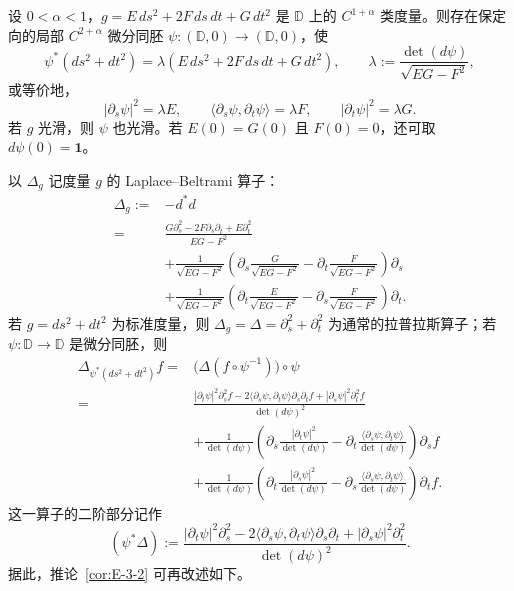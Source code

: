 \begin{corollary}\label{cor:E-3-2}
设 $0<\alpha<1$，$g=E\,ds^2+2F\,ds\,dt+G\,dt^2$ 是 $\mathbb D$ 上的 $C^{1+\alpha}$ 类度量。则存在保定向的局部 $C^{2+\alpha}$ 微分同胚 $\psi:(\mathbb D,0)\to(\mathbb D,0)$，使
\[
  \psi^*(ds^2+dt^2)=\lambda(E\,ds^2+2F\,ds\,dt+G\,dt^2),
  \qquad \lambda:=\frac{\det(d\psi)}{\sqrt{EG-F^2}},
\]
或等价地，
\[
  |\partial_s\psi|^2=\lambda E,\qquad
  \langle\partial_s\psi,\partial_t\psi\rangle=\lambda F,\qquad
  |\partial_t\psi|^2=\lambda G.
\]
若 $g$ 光滑，则 $\psi$ 也光滑。若 $E(0)=G(0)$ 且 $F(0)=0$，还可取 $d\psi(0)=\mathbf1$。
\end{corollary}

以 $\Delta_g$ 记度量 $g$ 的 Laplace--Beltrami 算子：
\begin{align*}
\Delta_g:={}&-d^*d\\
={}&\frac{G\partial_s^2-2F\partial_s\partial_t+E\partial_t^2}{EG-F^2}\\
&+\frac1{\sqrt{EG-F^2}}
 \left(\partial_s\frac{G}{\sqrt{EG-F^2}}-\partial_t\frac{F}{\sqrt{EG-F^2}}\right)\partial_s\\
&+\frac1{\sqrt{EG-F^2}}
 \left(\partial_t\frac{E}{\sqrt{EG-F^2}}-\partial_s\frac{F}{\sqrt{EG-F^2}}\right)\partial_t.
\end{align*}
若 $g=ds^2+dt^2$ 为标准度量，则 $\Delta_g=\Delta=\partial_s^2+\partial_t^2$ 为通常的拉普拉斯算子；若 $\psi:\mathbb D\to\mathbb D$ 是微分同胚，则
\begin{align*}
\Delta_{\psi^*(ds^2+dt^2)}f
={}&\bigl(\Delta(f\circ\psi^{-1})\bigr)\circ\psi\\
={}&\frac{|\partial_t\psi|^2\partial_s^2f
 -2\langle\partial_s\psi,\partial_t\psi\rangle\partial_s\partial_tf
 +|\partial_s\psi|^2\partial_t^2f}{\det(d\psi)^2}\\
&+\frac1{\det(d\psi)}\left(
 \partial_s\frac{|\partial_t\psi|^2}{\det(d\psi)}
 -\partial_t\frac{\langle\partial_s\psi,\partial_t\psi\rangle}{\det(d\psi)}\right)\partial_sf\\
&+\frac1{\det(d\psi)}\left(
 \partial_t\frac{|\partial_s\psi|^2}{\det(d\psi)}
 -\partial_s\frac{\langle\partial_s\psi,\partial_t\psi\rangle}{\det(d\psi)}\right)\partial_tf.
\end{align*}
这一算子的二阶部分记作
\begin{equation}\label{eq:E-3-1}
  (\psi^*\Delta):=
  \frac{|\partial_t\psi|^2\partial_s^2
  -2\langle\partial_s\psi,\partial_t\psi\rangle\partial_s\partial_t
  +|\partial_s\psi|^2\partial_t^2}{\det(d\psi)^2}.
\end{equation}
据此，推论~\ref{cor:E-3-2} 可再改述如下。


